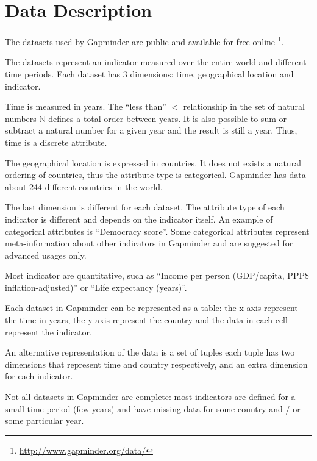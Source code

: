 \section{Data Description}
\label{sec:data}

The datasets used by Gapminder are public and available for free online \footnote{\url{http://www.gapminder.org/data/}}.

The datasets represent an indicator measured over the entire world and different time periods.
Each dataset has \num{3} dimensions: time, geographical location and indicator.

Time is measured in years.
The ``less than'' $<$ relationship in the set of natural numbers $\mathbb{N}$ defines a total order between years.
It is also possible to sum or subtract a natural number for a given year and the result is still a year.
Thus, time is a discrete attribute.

The geographical location is expressed in countries.
It does not exists a natural ordering of countries, thus the attribute type is categorical.
Gapminder has data about \num{244} different countries in the world.

The last dimension is different for each dataset.
The attribute type of each indicator is different and depends on the indicator itself.
An example of categorical attributes is ``Democracy score''.
Some categorical attributes represent meta-information about other indicators in Gapminder and are suggested for advanced usages only.


Most indicator are quantitative, such as ``Income per person (GDP/capita, PPP\$ inflation-adjusted)'' or ``Life expectancy (years)''.

Each dataset in Gapminder can be represented as a table:
the x-axis represent the time in years, the y-axis represent the country and the data in each cell represent the indicator.

An alternative representation of the data is a set of tuples
each tuple has two dimensions that represent time and country respectively, and an extra dimension for each indicator.

Not all datasets in Gapminder are complete:
most indicators are defined for a small time period (few years) and have missing data for some country and / or some particular year.
